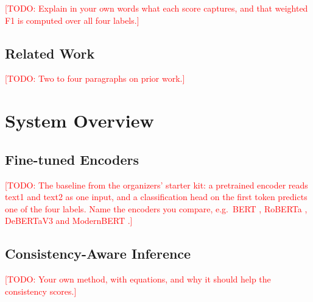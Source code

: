 \documentclass[11pt]{article}
\newcommand{\todo}[1]{\textcolor{red}{[TODO: #1]}}
\begin{document}
\todo{Explain in your own words what each score captures, and that weighted F1 is computed over all four labels.}

\subsection{Related Work}

\todo{Two to four paragraphs on prior work.}

\section{System Overview}

\subsection{Fine-tuned Encoders}
\todo{The baseline from the organizers' starter kit: a pretrained encoder reads text1 and text2 as one input, and a classification head on the first token predicts one of the four labels. Name the encoders you compare, e.g.\ BERT \citep{devlin-etal-2019-bert}, RoBERTa \citep{liu2019roberta}, DeBERTaV3 \citep{he2023debertav3} and ModernBERT \citep{warner2024modernbert}.}

\subsection{Consistency-Aware Inference}
\todo{Your own method, with equations, and why it should help the consistency scores.}
\end{document}
